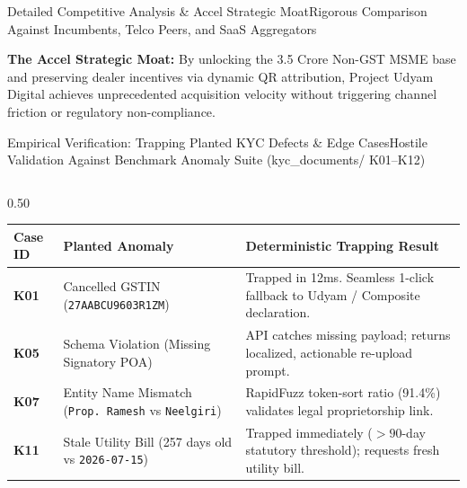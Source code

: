\documentclass[aspectratio=169,10pt]{beamer}
\begin{document}
\begin{frame}{Detailed Competitive Analysis \& Accel Strategic Moat}{Rigorous Comparison Against Incumbents, Telco Peers, and SaaS Aggregators}
  \vspace{0.06cm}
  \begin{tcolorbox}[accentbox]
    {\fontsize{5.8pt}{7.0pt}\selectfont
    \textbf{The Accel Strategic Moat:} By unlocking the 3.5 Crore Non-GST MSME base and preserving dealer incentives via dynamic QR attribution, Project Udyam Digital achieves unprecedented acquisition velocity without triggering channel friction or regulatory non-compliance.
    }
  \end{tcolorbox}
\end{frame}

\begin{frame}{Empirical Verification: Trapping Planted KYC Defects \& Edge Cases}{Hostile Validation Against Benchmark Anomaly Suite (kyc\_documents/ K01--K12)}
  \begin{columns}[T]
    \begin{column}{0.50\textwidth}
      \begin{tcolorbox}[academicbox, title={\fontsize{6.5pt}{7.8pt}\selectfont\textbf{Benchmark Anomaly Trapping Matrix}}, coltitle=charcoal]
        {\fontsize{5.2pt}{6.4pt}\selectfont
        \begin{tabularx}{\linewidth}{p{1.0cm}p{1.9cm}X}
          \toprule
          \textbf{Case ID} & \textbf{Planted Anomaly} & \textbf{Deterministic Trapping Result} \\
          \midrule
          \textbf{K01} & Cancelled GSTIN (\texttt{27AABCU9603R1ZM}) & Trapped in 12ms. Seamless 1-click fallback to Udyam / Composite declaration. \\
          \addlinespace[1pt]
          \textbf{K05} & Schema Violation (Missing Signatory POA) & API catches missing payload; returns localized, actionable re-upload prompt. \\
          \addlinespace[1pt]
          \textbf{K07} & Entity Name Mismatch (\texttt{Prop. Ramesh} vs \texttt{Neelgiri}) & RapidFuzz token-sort ratio (91.4\%) validates legal proprietorship link. \\
          \addlinespace[1pt]
          \textbf{K11} & Stale Utility Bill (257 days old vs \texttt{2026-07-15}) & Trapped immediately ($>90$-day statutory threshold); requests fresh utility bill. \\
          \bottomrule
        \end{tabularx}
        }
      \end{tcolorbox}


\end{column}
\end{columns}
\end{frame}
\end{document}
